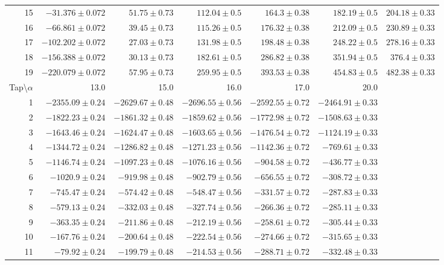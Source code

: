 \documentclass[runningheads]{llncs}
\begin{document}
\begin{table}
\begin{center}
\begin{tabular}{rrrrrrr}
15 &   $-31.376\pm0.072$ &    $51.75\pm0.73$ &   $112.04\pm0.5$ &     $164.3\pm0.38$ &    $182.19\pm0.5$ &    $204.18\pm0.33$ \\
16 &   $-66.861\pm0.072$ &    $39.45\pm0.73$ &   $115.26\pm0.5$ &    $176.32\pm0.38$ &    $212.09\pm0.5$ &    $230.89\pm0.33$ \\
17 &   $-102.202\pm0.072$ &    $27.03\pm0.73$ &   $131.98\pm0.5$ &    $198.48\pm0.38$ &    $248.22\pm0.5$ &    $278.16\pm0.33$ \\
18 &  $-156.388\pm0.072$ &    $30.13\pm0.73$ &   $182.61\pm0.5$ &    $286.82\pm0.38$ &    $351.94\pm0.5$ &     $376.4\pm0.33$ \\
19 &  $-220.079\pm0.072$ &    $57.95\pm0.73$ &   $259.95\pm0.5$ &    $393.53\pm0.38$ &    $454.83\pm0.5$ &    $482.38\pm0.33$ \\
\bottomrule
\toprule
{}Tap\textbackslash$\alpha$ &               13.0 &               15.0 &               16.0 &               17.0 &       
        20.0 \\
\midrule
1  &   $-2355.09\pm0.24$ &  $-2629.67\pm0.48$ &  $-2696.55\pm0.56$ &  $-2592.55\pm0.72$ &  $-2464.91\pm0.33$ \\
2  &   $-1822.23\pm0.24$ &  $-1861.32\pm0.48$ &  $-1859.62\pm0.56$ &  $-1772.98\pm0.72$ &  $-1508.63\pm0.33$ \\
3  &   $-1643.46\pm0.24$ &  $-1624.47\pm0.48$ &  $-1603.65\pm0.56$ &  $-1476.54\pm0.72$ &  $-1124.19\pm0.33$ \\
4  &   $-1344.72\pm0.24$ &  $-1286.82\pm0.48$ &  $-1271.23\pm0.56$ &  $-1142.36\pm0.72$ &   $-769.61\pm0.33$ \\
5  &   $-1146.74\pm0.24$ &  $-1097.23\pm0.48$ &  $-1076.16\pm0.56$ &   $-904.58\pm0.72$ &   $-436.77\pm0.33$ \\
6  &    $-1020.9\pm0.24$ &   $-919.98\pm0.48$ &   $-902.79\pm0.56$ &   $-656.55\pm0.72$ &   $-308.72\pm0.33$ \\
7  &    $-745.47\pm0.24$ &   $-574.42\pm0.48$ &   $-548.47\pm0.56$ &   $-331.57\pm0.72$ &   $-287.83\pm0.33$ \\
8  &    $-579.13\pm0.24$ &   $-332.03\pm0.48$ &   $-327.74\pm0.56$ &   $-266.36\pm0.72$ &   $-285.11\pm0.33$ \\
9  &    $-363.35\pm0.24$ &   $-211.86\pm0.48$ &   $-212.19\pm0.56$ &   $-258.61\pm0.72$ &   $-305.44\pm0.33$ \\
10 & $-167.76\pm0.24$ &   $-200.64\pm0.48$ &   $-222.54\pm0.56$ &   $-274.66\pm0.72$ &   $-315.65\pm0.33$ \\
11 &   $-79.92\pm0.24$ &   $-199.79\pm0.48$ &   $-214.53\pm0.56$ &   $-288.71\pm0.72$ &   $-332.48\pm0.33$ \\

\end{tabular}
\end{center}
\end{table}
\end{document}
